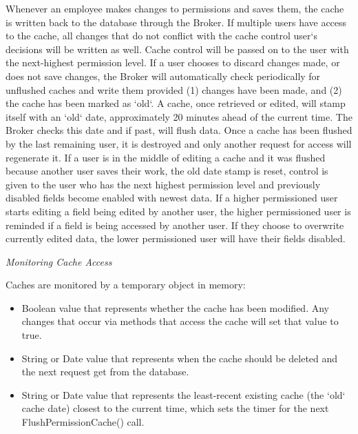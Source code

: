 \documentclass[letterpaper,12pt]{report}
\begin{document}
{\begin{description}
	  \par \noindent \hspace*{1cm} Whenever an employee makes changes to permissions and saves them, the cache is written back to the database through the Broker. If multiple users have access to the cache, all changes that do not conflict with the cache control user`s decisions will be written as well. Cache control will be passed on to the user with the next-highest permission level. If a user chooses to discard changes made, or does not save changes, the Broker will automatically check periodically for unflushed caches and write them provided (1) changes have been made, and (2) the cache has been marked as `old`. A cache, once retrieved or edited, will stamp itself with an `old` date, approximately 20 minutes ahead of the current time. The Broker checks this date and if past, will flush data. Once a cache has been flushed by the last remaining user, it is destroyed and only another request for access will regenerate it. If a user is in the middle of editing a cache and it was flushed because another user saves their work, the old date stamp is reset, control is given to the user who has the next highest permission level and previously disabled fields become enabled with newest data. If a higher permissioned user starts editing a field being edited by another user, the higher permissioned user is reminded if a field is being accessed by another user. If they choose to overwrite currently edited data, the lower permissioned user will have their fields disabled.
	  \par \noindent
	  \textit{Monitoring Cache Access}
	  \par \noindent \hspace*{1cm} Caches are monitored by a temporary object in memory:
	  \begin{itemize}
	   \item Boolean value that represents whether the cache has been modified. Any changes that occur via methods that access the cache will set that value to true.
	   \item String or Date value that represents when the cache should be deleted and the next request get from the database.
	   \item String or Date value that represents the least-recent existing cache (the `old` cache date) closest to the current time, which sets the timer for the next FlushPermissionCache() call.
	  \end{itemize}


\end{description}}
\end{document}

